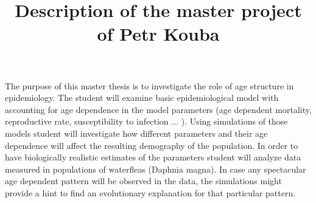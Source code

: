 \documentclass{article}
\title{Description of the master project of Petr Kouba}
\begin{document}
\maketitle

The purpose of this master thesis is to investigate the role of age structure in epidemiology. The student will examine basic epidemiological model with accounting for age dependence in the model parameters (age dependent mortality, reproductive rate, susceptibility to infection ... ). Using simulations of those models student will investigate how different parameters and their age dependence will affect the resulting demography of the population. In order to have biologically realistic estimates of the parameters student will analyze data measured in populations of waterfleas (Daphnia magna). In case any spectacular age dependent pattern will be observed in the data, the simulations might provide a hint to find an evolutionary explanation for that particular pattern.
\end{document}

